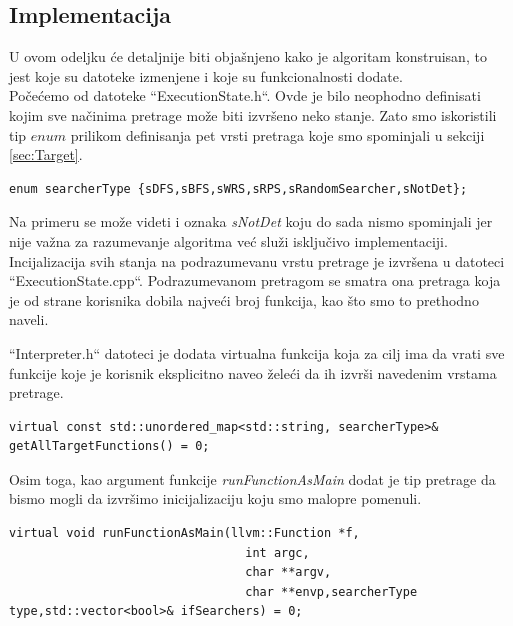 \documentclass[a4paper]{article}
\begin{document}
\subsection{Implementacija}\label{subsec:impl}
U ovom odeljku će detaljnije biti objašnjeno kako je algoritam konstruisan, to jest koje su datoteke izmenjene i koje su funkcionalnosti dodate. \\

Počećemo od datoteke ``ExecutionState.h``. Ovde je bilo neophodno definisati kojim sve načinima pretrage može biti izvršeno neko stanje. Zato smo iskoristili tip $enum$ prilikom definisanja pet vrsti pretraga koje smo spominjali u sekciji \ref{sec:Target}.
\begin{lstlisting}
enum searcherType {sDFS,sBFS,sWRS,sRPS,sRandomSearcher,sNotDet};
\end{lstlisting}
Na primeru se može videti i oznaka \textit{sNotDet} koju do sada nismo spominjali jer nije važna za razumevanje algoritma već služi isključivo implementaciji.\\

Incijalizacija svih stanja na podrazumevanu vrstu pretrage je izvršena u datoteci ``ExecutionState.cpp``. Podrazumevanom pretragom se smatra ona pretraga koja je od strane korisnika dobila najveći broj funkcija, kao što smo to prethodno naveli.

``Interpreter.h`` datoteci je dodata virtualna funkcija koja za cilj ima da vrati sve funkcije koje je korisnik eksplicitno naveo želeći da ih izvrši navedenim vrstama pretrage.
\begin{lstlisting}
virtual const std::unordered_map<std::string, searcherType>& getAllTargetFunctions() = 0;
\end{lstlisting}
Osim toga, kao argument funkcije \textit{runFunctionAsMain} dodat je tip pretrage da bismo mogli da izvršimo inicijalizaciju koju smo malopre pomenuli. 
\begin{lstlisting}
virtual void runFunctionAsMain(llvm::Function *f,
                                 int argc,
                                 char **argv,
                                 char **envp,searcherType type,std::vector<bool>& ifSearchers) = 0;
\end{lstlisting}
\end{document}

